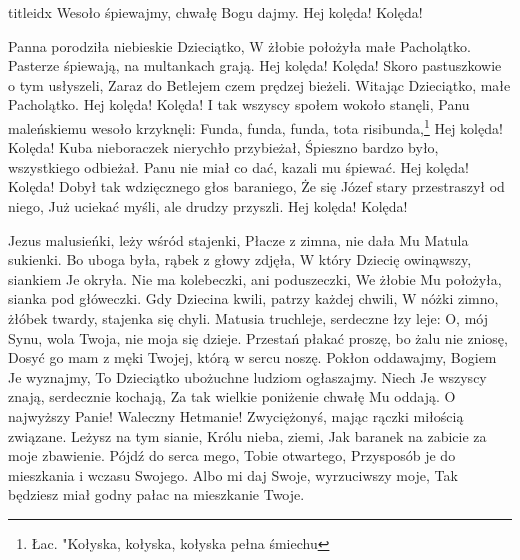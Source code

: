 \documentclass[a5paper, portrait, 12pt]{mwart}
\begin{document}
\begin{songs}{titleidx}
\beginchorus
        Wesoło śpiewajmy, chwałę Bogu dajmy.
        Hej kolęda! Kolęda!
\endchorus

\beginverse
    Panna porodziła niebieskie Dzieciątko,
    W żłobie położyła małe Pacholątko.
\endverse		
\beginchorus
        Pasterze śpiewają, na multankach grają.
        Hej kolęda! Kolęda!	
\endchorus	
\beginverse
    Skoro pastuszkowie o tym usłyszeli,
    Zaraz do Betlejem czem prędzej bieżeli.
\endverse
\beginchorus
        Witając Dzieciątko, małe Pacholątko.
        Hej kolęda! Kolęda!
\endchorus
\beginverse
    I tak wszyscy społem wokoło stanęli,
    Panu maleńskiemu wesoło krzyknęli:
\endverse
\beginchorus
	Funda, funda, funda, tota risibunda,\footnote{Łac. "Kołyska, kołyska, kołyska pełna śmiechu}
        Hej kolęda! Kolęda!
\endchorus
\beginverse
    Kuba nieboraczek nierychło przybieżał,
    Śpieszno bardzo było, wszystkiego odbieżał.
\endverse
\beginchorus
        Panu nie miał co dać, kazali mu śpiewać.
        Hej kolęda! Kolęda!
\endchorus
\beginverse
    Dobył tak wdzięcznego głos baraniego,
    Że się Józef stary przestraszył od niego,
\endverse
\beginchorus
    Już uciekać myśli, ale drudzy przyszli.
    Hej kolęda! Kolęda!
\endchorus
\endsong






\beginverse
    Jezus malusieńki, leży wśród stajenki,
    Płacze z zimna, nie dała Mu Matula sukienki.
\endverse
\beginverse
    Bo uboga była, rąbek z głowy zdjęła,
    W który Dziecię owinąwszy, siankiem Je okryła.
\endverse
\beginverse
    Nie ma kolebeczki, ani poduszeczki,
    We żłobie Mu położyła, sianka pod główeczki.
\endverse
\beginverse
    Gdy Dziecina kwili, patrzy każdej chwili,
    W nóżki zimno, żłóbek twardy, stajenka się chyli.
\endverse
\beginverse
    Matusia truchleje, serdeczne łzy leje:
    O, mój Synu, wola Twoja, nie moja się dzieje.
\endverse
\beginverse
    Przestań płakać proszę, bo żalu nie zniosę,
    Dosyć go mam z męki Twojej, którą w sercu noszę.
\endverse
\beginverse
    Pokłon oddawajmy, Bogiem Je wyznajmy,
    To Dzieciątko ubożuchne ludziom ogłaszajmy.
\endverse
\beginverse
    Niech Je wszyscy znają, serdecznie kochają,
    Za tak wielkie poniżenie chwałę Mu oddają.
\endverse
\beginverse
    O najwyższy Panie! Waleczny Hetmanie!
    Zwyciężonyś, mając rączki miłością związane.
\endverse
\beginverse
    Leżysz na tym sianie, Królu nieba, ziemi,
    Jak baranek na zabicie za moje zbawienie.
\endverse
\beginverse
    Pójdź do serca mego, Tobie otwartego,
    Przysposób je do mieszkania i wczasu Swojego.
\endverse
\beginverse
    Albo mi daj Swoje, wyrzuciwszy moje,
    Tak będziesz miał godny pałac na mieszkanie Twoje.
\endverse
\endsong


\end{songs}
\end{document}
